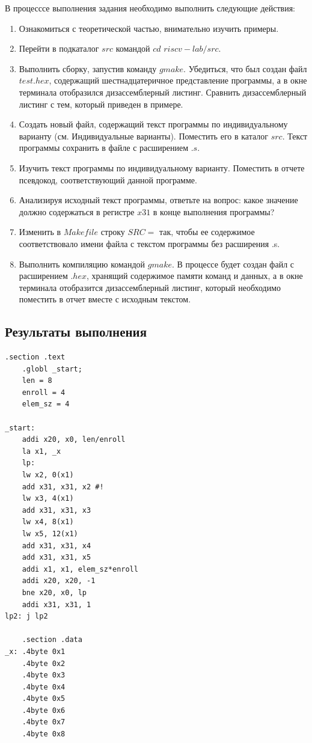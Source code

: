 В процесссе выполнения задания необходимо выполнить следующие действия:
\begin{enumerate}
	\item Ознакомиться с теоретической частью, внимательно изучить примеры.
	\item Перейти в подкаталог $src$ командой $cd$ $riscv-lab/src$.
	\item Выполнить сборку, запустив команду $gmake$. Убедиться, что был создан файл $test.hex$, содержащий шестнадцатеричное представление программы, а в окне терминала отобразился дизассемблерный листинг. Сравнить дизассемблерный листинг с тем, который приведен в примере.
	\item Создать новый файл, содержащий текст программы по индивидуальному варианту (см. Индивидуальные варианты). Поместить его в каталог $src$. Текст программы сохранить в файле с расширением $.s$.
	\item Изучить текст программы по индивидуальному варианту. Поместить в отчете псевдокод, соответствующий данной программе.
	\item Анализируя исходный текст программы, ответьте на вопрос: какое значение должно содержаться в регистре $x31$ в конце выполнения программы?
	\item Изменить в $Makefile$ строку $SRC=$ так, чтобы ее содержимое соответствовало имени файла с текстом программы без расширения .s.
	\item Выполнить компиляцию командой $gmake$. В процессе будет создан файл с расширением $.hex$, хранящий содержимое памяти команд и данных, а в окне терминала отобразится дизассемблерный листинг, который необходимо поместить в отчет вместе с исходным текстом.
\end{enumerate}

\subsection*{Результаты выполнения}

\begin{lstlisting}[label=lst:v11,caption=Код программы 9 варианта]
	.section .text
	.globl _start;
	len = 8 
	enroll = 4
	elem_sz = 4 
	
_start:
	addi x20, x0, len/enroll
	la x1, _x
	lp:
	lw x2, 0(x1)
	add x31, x31, x2 #!
	lw x3, 4(x1)
	add x31, x31, x3
	lw x4, 8(x1)
	lw x5, 12(x1)
	add x31, x31, x4
	add x31, x31, x5
	addi x1, x1, elem_sz*enroll
	addi x20, x20, -1
	bne x20, x0, lp
	addi x31, x31, 1
lp2: j lp2
	
	.section .data
_x: .4byte 0x1
	.4byte 0x2
	.4byte 0x3
	.4byte 0x4
	.4byte 0x5
	.4byte 0x6
	.4byte 0x7
	.4byte 0x8
\end{lstlisting}

